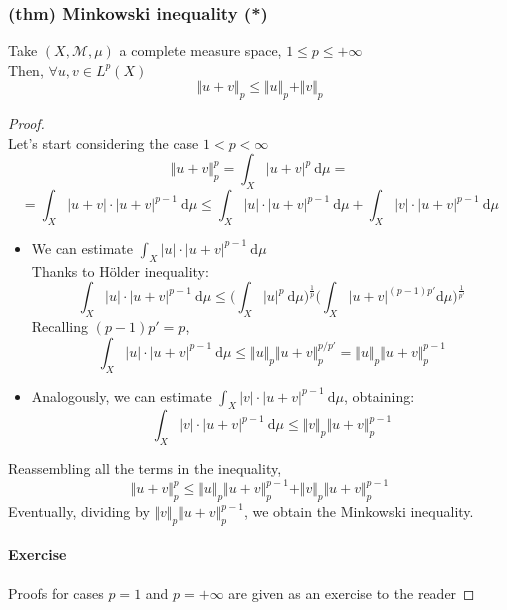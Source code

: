 \subsubsection{(thm) Minkowski inequality (*)}
Take $(X,\mathcal M,\mu)$ a complete measure space, $1\leq p\leq +\infty$\\
Then, $\forall u,v\in L^p(X)$
$$\Vert u+v\Vert_p\leq \Vert u\Vert_p+\Vert v\Vert_p$$
\begin{proof}\ \\
    Let's start considering the case $1<p<\infty$
    $$\Vert u+v\Vert_p^p=\int_X|u+v|^p\ \mathrm d\mu =$$
    $$= \int_X |u+v|\cdot |u+v|^{p-1}\ \mathrm d\mu\leq \int_X |u|\cdot |u+v|^{p-1}\ \mathrm d\mu +\int_X|v|\cdot |u+v|^{p-1}\ \mathrm d\mu$$
    \begin{itemize}
        \item We can estimate $\int_X |u|\cdot |u+v|^{p-1}\ \mathrm d\mu $ \\ Thanks to Hölder inequality:
    $$\int_X |u|\cdot |u+v|^{p-1}\ \mathrm d\mu \leq \Big (\int_X |u|^p\ \mathrm d\mu \Big)^{\frac 1p}\Big ( \int_X |u+v|^{(p-1)p'}\mathrm d\mu\Big)^{\frac 1{p'}}$$
    Recalling $(p-1)p'=p$,
    $$\int_X |u|\cdot |u+v|^{p-1}\ \mathrm d\mu \leq \Vert u \Vert_p\Vert u+v\Vert_p^{p/p'}=\Vert u\Vert_p\Vert u+v\Vert_p^{p-1}$$
    \item Analogously, we can estimate $\int_X|v|\cdot |u+v|^{p-1}\ \mathrm d\mu$, obtaining:
    $$\int_X|v|\cdot |u+v|^{p-1}\ \mathrm d\mu\leq \Vert v\Vert_p\Vert u+v\Vert_p^{p-1}$$
    \end{itemize}
    Reassembling all the terms in the inequality,
    $$\Vert u+v\Vert_p^p\leq \Vert u\Vert_p\Vert u+v\Vert_p^{p-1}+\Vert v\Vert_p\Vert u+v\Vert_p^{p-1}$$
    Eventually, dividing by $\Vert v\Vert_p\Vert u+v\Vert_p^{p-1}$, we obtain the Minkowski inequality.

    \paragraph{Exercise} Proofs for cases $p=1$ and $p=+\infty$ are given as an exercise to the reader
    
\end{proof}
